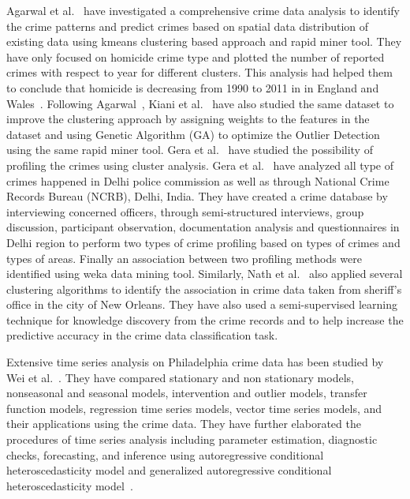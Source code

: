 Agarwal et al.~\cite{hid-sp18-409-agarwal2013crime} have investigated
a comprehensive crime data analysis to identify the crime patterns and
predict crimes based on spatial data distribution of existing data
using kmeans clustering based approach and rapid miner tool. They have
only focused on homicide crime type and plotted the number of reported
crimes with respect to year for different clusters. This analysis had
helped them to conclude that homicide is decreasing from 1990 to 2011
in in England and Wales~\cite{hid-sp18-409-agarwal2013crime}.
Following Agarwal~\cite{hid-sp18-409-agarwal2013crime}, Kiani et
al.~\cite{hid-sp18-409-kiani2015analysis} have also studied the same
dataset to improve the clustering approach by assigning weights to the
features in the dataset and using Genetic Algorithm (GA) to optimize
the Outlier Detection using the same rapid miner tool. Gera et
al.~\cite{hid-sp18-409-gera2014city} have studied the possibility of
profiling the crimes using cluster analysis. Gera et
al.~\cite{hid-sp18-409-gera2014city} have analyzed all type of crimes
happened in Delhi police commission as well as through National Crime
Records Bureau (NCRB), Delhi, India. They have created a crime
database by interviewing concerned officers, through semi-structured
interviews, group discussion, participant observation, documentation
analysis and questionnaires in Delhi region to perform two types of
crime profiling based on types of crimes and types of areas. Finally
an association between two profiling methods were identified using
weka data mining tool. Similarly, Nath et
al.~\cite{hid-sp18-409-nath2006crime} also applied several clustering
algorithms to identify the association in crime data taken from
sheriff’s office in the city of New Orleans. They have also used a
semi-supervised learning technique for knowledge discovery from the
crime records and to help increase the predictive accuracy in the
crime data classification task.

Extensive time series analysis on Philadelphia crime data has been studied by Wei et al.~\cite{hid-sp18-409-wei2006time}. They have compared stationary and non stationary models, nonseasonal and seasonal models, intervention and outlier models, transfer function models, regression time series models, vector time series models, and their applications using the crime data. They have further elaborated the procedures of time series analysis including parameter estimation, diagnostic checks, forecasting, and inference using autoregressive conditional heteroscedasticity model and generalized autoregressive conditional heteroscedasticity model~\cite{hid-sp18-409-wei2006time}. 


